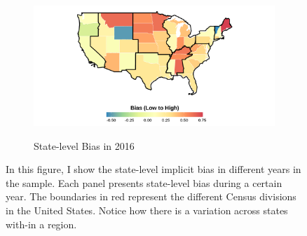 \documentclass[12pt,english]{article}
\begin{document}
\begin{center}
\begin{figure}[H]
\begin{subfigure}{.45\textwidth}
\label{fig:skiniat-map-2008}
\end{subfigure}
\hfill%
\begin{subfigure}{.45\textwidth}
\caption{State-level Bias in 2016}
\centering
\includegraphics[width=0.9\linewidth]{figure/2016skinmap.png} 
\label{fig:skiniat-map-2010}
\end{subfigure}

\caption*{\footnotesize{In this figure, I show the state-level implicit bias in different years in the sample. Each panel presents state-level bias during a certain year. The boundaries in red represent the different Census divisions in the United States. Notice how there is a variation across states with-in a region.}}
\end{figure}
\end{center}

\pagebreak
\newpage
\end{document}
